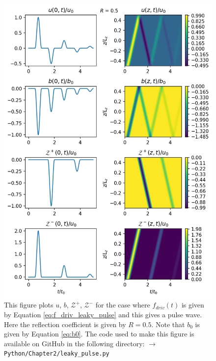 \begin{figure}
    \centering
    \vspace{-20pt}
    \includegraphics[width=\textwidth,height=0.9\textheight,keepaspectratio]{figures/chapter02/leaky_pulse.png}
    \vspace{-10pt}
    \caption{This figure plots $u$, $b$, $\mathcal{Z}^{+}$, $\mathcal{Z^{-}}$ for the case where $f_{driv}(t)$ is given by Equation \eqref{eq:f_driv_leaky_pulse} and this gives a pulse wave. Here the reflection coefficient is given by $R=0.5$. Note that $b_0$ is given by Equation \eqref{eq:b0}. The code used to make this figure is available on GitHub in the following directory:\newline
    \texttt{$\rightarrow$ Python/Chapter2/leaky\_pulse.py}}
    \vspace{-30pt}
    \label{fig:leaky_pulse}
\end{figure}

